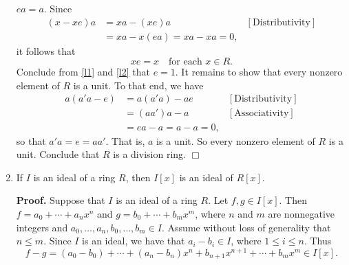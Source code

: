 \documentclass[9pt]{article}
\newcommand{\qed}{\hfill \ensuremath{\Box}}
\begin{document}
\begin{enumerate}
      $ea = a$. Since
      \begin{align*}
         (x - xe)a &= xa - (xe)a &[\text{Distributivity}] \\ 
            &= xa - x(ea) = xa - xa = 0,
      \end{align*}
      it follows that
      \begin{equation} \label{l2}
         xe = x \quad \text{for each } x \in R.
      \end{equation}
      Conclude from \eqref{l1} and \eqref{l2} that $e = 1$. It remains to show
      that every nonzero element of $R$ is a unit. To that end, we have
      \begin{align*}
         a(a'a - e) &= a(a'a) - ae &[\text{Distributivity}] \\ 
            &= (aa')a - a &[\text{Associativity}] \\
            &= ea - a = a - a = 0,
      \end{align*}
      so that $a'a = e = aa'$. That is, $a$ is a unit. So every nonzero element
      of $R$ is a unit. Conclude that $R$ is a division ring. \qed
   \item If $I$ is an ideal of a ring $R$, then $I[x]$ is an ideal of $R[x]$.
         
      \textbf{Proof.} Suppose that $I$ is an ideal of a ring $R$. Let
      $f, g \in I[x]$. Then $f = a_0 + \cdots + a_nx^n$ and
      $g = b_0 + \cdots + b_mx^m$, where $n$ and $m$ are nonnegative integers
      and $a_0, \ldots, a_n, b_0, \ldots, b_m \in I$. Assume without loss of
      generality that $n \le m$. Since $I$ is an ideal, we have that
      $a_i - b_i \in I$, where $1 \le i \le n$. Thus
      $$f - g = (a_0 - b_0) + \cdots + (a_n - b_n)x^n + b_{n + 1}x^{n + 1} +
        \cdots + b_mx^m \in I[x].$$
\end{enumerate}
\end{document}
